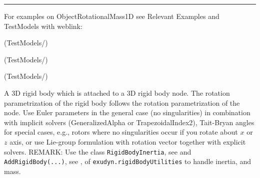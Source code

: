 \vspace{6pt}\par\noindent\rule{\textwidth}{0.4pt}
%
\noindent For examples on ObjectRotationalMass1D see Relevant Examples and TestModels with weblink:
\bi
\item {} (TestModels/)
\item {} (TestModels/)
\item {} (TestModels/)

\ei

%
\newpage


\label{sec:item:ObjectRigidBody}
A 3D rigid body which is attached to a 3D rigid body node. The rotation parametrization of the rigid body follows the rotation parametrization of the node. Use Euler parameters in the general case (no singularities) in combination with implicit solvers (GeneralizedAlpha or TrapezoidalIndex2), Tait-Bryan angles for special cases, e.g., rotors where no singularities occur if you rotate about $x$ or $z$ axis, or use Lie-group formulation with rotation vector together with explicit solvers. REMARK: Use the class \texttt{RigidBodyInertia}, see  and \texttt{AddRigidBody(...)}, see , of \texttt{exudyn.rigidBodyUtilities} to handle inertia,  and mass. 
\vspace{12pt}\\

